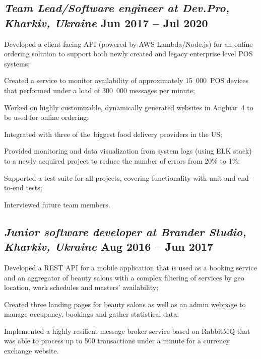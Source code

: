 \documentclass[a4paper,12pt]{book}
\begin{document}
\subsection{{\sl\bf\hspace{0.1in}Team Lead/Software engineer at Dev.Pro, Kharkiv, Ukraine} \hfill Jun 2017 -- Jul 2020}
\begin{zitemize}
 \item Developed a client facing API (powered by AWS Lambda/Node.js) for an online ordering solution to support both newly created and legacy enterprise level POS systems;
 \item Created a service to monitor availability of approximately 15~000~POS devices that performed under a load of 300~000 messages per minute;
 \item Worked on highly customizable, dynamically generated websites in Angluar~4 to be used for online ordering;
 \item Integrated with three of the~biggest food delivery providers in the US;
 \item Provided monitoring and data visualization from system logs (using ELK stack) to a newly acquired project to reduce the number of errors from 20\% to 1\%;
 \item Supported a test suite for all projects, covering functionality with unit and end-to-end tests;
 \item Interviewed future team members.
\end{zitemize}

\subsection{{\sl\bf\hspace{0.1in} Junior software developer at Brander Studio, Kharkiv, Ukraine} \hfill Aug 2016 -- Jun 2017}
\begin{zitemize}
 \item Developed a REST API for a mobile application that is used as a booking service and an aggregator of beauty salons with a complex filtering of services by geo location, work schedules and masters' availability;
 \item Created three landing pages for beauty salons as well as an admin webpage to manage occupancy, bookings and gather statistical data;
 \item Implemented a highly resilient message broker service based on RabbitMQ that was able to process up to 500 transactions under a minute for a currency exchange website.
\end{zitemize}
\end{document}
